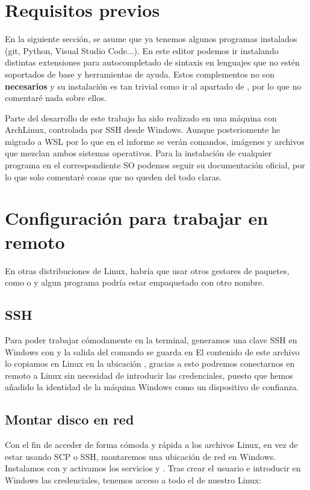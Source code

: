 \section{Requisitos previos}
En la siguiente sección, se asume que ya tenemos algunos programas instalados (git, Python,  Visual Studio Code...). En este editor podemos ir instalando distintas extensiones para autocompletado de sintaxis en lenguajes que no estén soportados de base y herramientas de ayuda. Estos complementos no son \textbf{necesarios} y su instalación es tan trivial como ir al apartado de , por lo que no comentaré nada sobre ellos.

Parte del desarrollo de este trabajo ha sido realizado en una máquina con ArchLinux, controlada por SSH desde Windows. Aunque posteriomente he migrado a WSL\cite{wsl} por lo que en el informe se verán comandos, imágenes y archivos que mezclan ambos sistemas operativos. Para la instalación de cualquier programa en el correspondiente SO podemos seguir su documentación oficial, por lo que solo comentaré cosas que no queden del todo claras.\par

\section{Configuración para trabajar en remoto}
\hr
En otras distribuciones de Linux, habría que usar otros gestores de paquetes, como  o  y algun programa podría estar empaquetado con otro nombre.
\hr

  \subsection{SSH}
  Para poder trabajar cómodamente en la terminal, generamos una clave SSH en Windows con  y la salida del comando se guarda en  \newline
  El contenido de este archivo lo copiamos en Linux en la ubicación , gracias a esto podremos conectarnos en remoto a Linux sin necesidad de introducir las credenciales, puesto que hemos añadido la identidad de la máquina Windows como un dispositivo de confianza.

  \subsection{Montar disco en red}
  Con el fin de acceder de forma cómoda y rápida a los archivos Linux, en vez de estar usando SCP o SSH, montaremos una ubicación de red en Windows. Instalamos con  y activamos los servicios  y . Tras crear el usuario e introducir en Windows las credenciales, tenemos acceso a todo el  de nuestro Linux:

